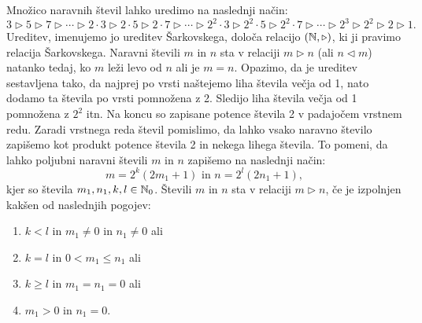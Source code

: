 \documentclass[../TG_magistrsko_delo_sections.tex]{subfiles}
\begin{document}
\begin{definicija}\label{def:ureditev-sark}
Množico naravnih števil lahko uredimo na naslednji način:
$$3 \triangleright 5 \triangleright 7 \triangleright \cdots \triangleright 2\cdot 3 \triangleright 2\cdot 5 \triangleright 2\cdot 7 \triangleright \cdots \triangleright 2^2\cdot 3 \triangleright 2^2\cdot 5 \triangleright 2^2\cdot 7 \triangleright \cdots \triangleright 2^3 \triangleright 2^2 \triangleright 2 \triangleright 1.$$
Ureditev, imenujemo jo ureditev Šarkovskega, določa relacijo $(\mathbb N, \triangleright)$, ki ji pravimo relacija Šarkovskega. Naravni števili $m$ in $n$ sta v relaciji $m\triangleright n$ (ali $n \triangleleft m$) natanko tedaj, ko $m$ leži levo od $n$ ali je $m=n$. Opazimo, da je ureditev sestavljena tako, da najprej po vrsti naštejemo liha števila večja od 1, nato dodamo ta števila po vrsti pomnožena z 2. Sledijo liha števila večja od 1 pomnožena z $2^2$ itn. Na koncu so zapisane potence števila 2 v padajočem vrstnem redu. Zaradi vrstnega reda števil pomislimo, da lahko vsako naravno število zapišemo kot produkt potence števila 2 in nekega lihega števila. To pomeni, da lahko poljubni naravni števili $m$ in $n$ zapišemo na naslednji način: 
\begin{equation}
m= 2^k(2m_1 +1)\text{ in } n= 2^l(2n_1 +1), \label{eq:zapis}
\end{equation}
 kjer so števila $m_1, n_1, k, l \in \mathbb N_0$. Števili $m$ in $n$ sta v relaciji $m \triangleright n$, če je izpolnjen kakšen od naslednjih pogojev:
\begin{enumerate}[label={(R\arabic*)}]
\item $k<l$ in $m_1 \neq 0$ in $n_1 \neq 0$ ali \label{rel1}
\item $k=l$ in $0<m_1 \leq n_1$ ali \label{rel2}
\item $k \geq l$ in $m_1 = n_1=0$ ali \label{rel3}
\item $m_1>0$ in $n_1 =0$. \label{rel4}
\end{enumerate}
\end{definicija}
\end{document}
